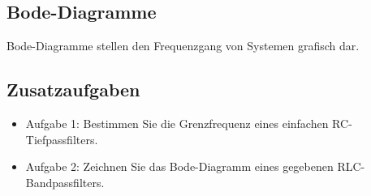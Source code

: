 \documentclass[11pt,a4paper]{article}
\begin{document}
\subsection{Bode-Diagramme}
Bode-Diagramme stellen den Frequenzgang von Systemen grafisch dar.

\subsection{Zusatzaufgaben}
\begin{itemize}
	\item Aufgabe 1: Bestimmen Sie die Grenzfrequenz eines einfachen RC-Tiefpassfilters.
	\item Aufgabe 2: Zeichnen Sie das Bode-Diagramm eines gegebenen RLC-Bandpassfilters.
\end{itemize}
\end{document}
